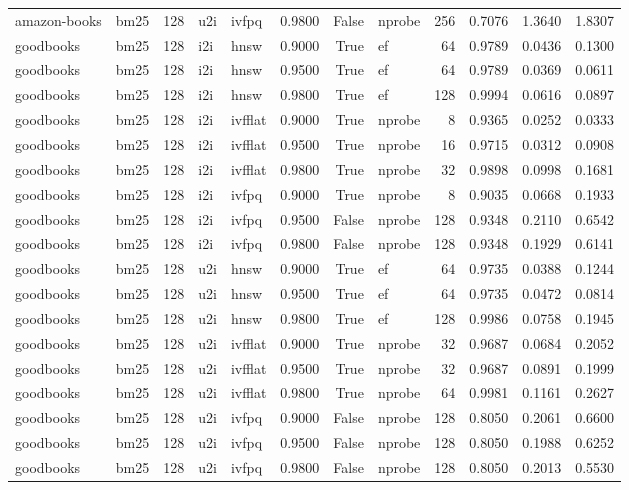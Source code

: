 \begin{tabular}{llrllrrlrrrr}
amazon-books & bm25 & 128 & u2i & ivfpq & 0.9800 & False & nprobe & 256 & 0.7076 & 1.3640 & 1.8307 \\
goodbooks & bm25 & 128 & i2i & hnsw & 0.9000 & True & ef & 64 & 0.9789 & 0.0436 & 0.1300 \\
goodbooks & bm25 & 128 & i2i & hnsw & 0.9500 & True & ef & 64 & 0.9789 & 0.0369 & 0.0611 \\
goodbooks & bm25 & 128 & i2i & hnsw & 0.9800 & True & ef & 128 & 0.9994 & 0.0616 & 0.0897 \\
goodbooks & bm25 & 128 & i2i & ivfflat & 0.9000 & True & nprobe & 8 & 0.9365 & 0.0252 & 0.0333 \\
goodbooks & bm25 & 128 & i2i & ivfflat & 0.9500 & True & nprobe & 16 & 0.9715 & 0.0312 & 0.0908 \\
goodbooks & bm25 & 128 & i2i & ivfflat & 0.9800 & True & nprobe & 32 & 0.9898 & 0.0998 & 0.1681 \\
goodbooks & bm25 & 128 & i2i & ivfpq & 0.9000 & True & nprobe & 8 & 0.9035 & 0.0668 & 0.1933 \\
goodbooks & bm25 & 128 & i2i & ivfpq & 0.9500 & False & nprobe & 128 & 0.9348 & 0.2110 & 0.6542 \\
goodbooks & bm25 & 128 & i2i & ivfpq & 0.9800 & False & nprobe & 128 & 0.9348 & 0.1929 & 0.6141 \\
goodbooks & bm25 & 128 & u2i & hnsw & 0.9000 & True & ef & 64 & 0.9735 & 0.0388 & 0.1244 \\
goodbooks & bm25 & 128 & u2i & hnsw & 0.9500 & True & ef & 64 & 0.9735 & 0.0472 & 0.0814 \\
goodbooks & bm25 & 128 & u2i & hnsw & 0.9800 & True & ef & 128 & 0.9986 & 0.0758 & 0.1945 \\
goodbooks & bm25 & 128 & u2i & ivfflat & 0.9000 & True & nprobe & 32 & 0.9687 & 0.0684 & 0.2052 \\
goodbooks & bm25 & 128 & u2i & ivfflat & 0.9500 & True & nprobe & 32 & 0.9687 & 0.0891 & 0.1999 \\
goodbooks & bm25 & 128 & u2i & ivfflat & 0.9800 & True & nprobe & 64 & 0.9981 & 0.1161 & 0.2627 \\
goodbooks & bm25 & 128 & u2i & ivfpq & 0.9000 & False & nprobe & 128 & 0.8050 & 0.2061 & 0.6600 \\
goodbooks & bm25 & 128 & u2i & ivfpq & 0.9500 & False & nprobe & 128 & 0.8050 & 0.1988 & 0.6252 \\
goodbooks & bm25 & 128 & u2i & ivfpq & 0.9800 & False & nprobe & 128 & 0.8050 & 0.2013 & 0.5530 \\

\end{tabular}
